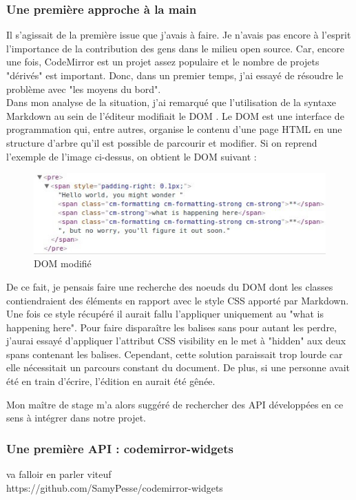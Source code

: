 \documentclass[12pt]{article}
\begin{document}
\subsubsection{Une première approche à la main}
Il s'agissait de la première issue que j'avais à faire. Je n'avais pas encore à l'esprit l'importance de la contribution des gens dans le milieu open source. Car, encore une fois, CodeMirror est un projet assez populaire et le nombre de projets "dérivés" est important. Donc, dans un premier temps, j'ai essayé de résoudre le problème avec "les moyens du bord".\\
Dans mon analyse de la situation, j'ai remarqué que l'utilisation de la syntaxe Markdown au sein de l'éditeur modifiait le DOM \cite{dom}. Le DOM est une interface de programmation qui, entre autres, organise le contenu d'une page HTML en une structure d'arbre qu'il est possible de parcourir et modifier. Si on reprend l'exemple de l'image ci-dessus, on obtient le DOM suivant :
\begin{figure}[H]
    \centering
    \includegraphics[scale=0.95]{gallery/modified_dom.jpg}
    \caption[nom dans le sommaire]{DOM modifié}
    \label{fig:gallery4}
\end{figure}
De ce fait, je pensais faire une recherche des noeuds du DOM dont les classes contiendraient des éléments en rapport avec le style CSS apporté par Markdown. Une fois ce style récupéré il aurait fallu l'appliquer uniquement au "what is happening here". Pour faire disparaître les balises sans pour autant les perdre, j'aurai essayé d'appliquer l'attribut CSS visibility en le met à "hidden" aux deux spans contenant les balises.
Cependant, cette solution paraissait trop lourde car elle nécessitait un parcours constant du document. De plus, si une personne avait été en train d'écrire, l'édition en aurait été gênée.

Mon maître de stage m'a alors suggéré de rechercher des API développées en ce sens à intégrer dans notre projet.

\subsubsection{Une première API : codemirror-widgets}
va falloir en parler viteuf\\
https://github.com/SamyPesse/codemirror-widgets
\end{document}
